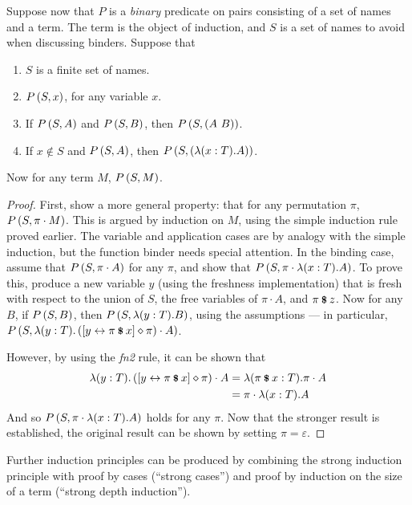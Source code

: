 \begin{lemma}
\label{lemma:strong-induction}
Suppose now that \(P\) is a \emph{binary} predicate on pairs consisting of a set of names and a term.
The term is the object of induction, and \(S\) is a set of names to avoid when discussing binders.
Suppose that
\begin{enumerate}
\item
\(S\) is a finite set of names.
\item
\(P\left(S, x\right)\), for any variable \(x\).
\item
If \(P\left(S, A\right)\) and \(P\left(S, B\right)\), then \(P\left(S, \left(A\ B\right)\right)\).
\item
If \(x \notin S\) and \(P\left(S, A\right)\), then \(P\left(S, \left(\lambda (x:T). A\right)\right)\).
\end{enumerate}
Now for any term \(M\), \(P\left(S, M\right)\).
\end{lemma}
\begin{proof}
First, show a more general property: that for any permutation \(\pi\), \(P\left(S, \pi \cdot M\right)\).
This is argued by induction on \(M\), using the simple induction rule proved earlier.
The variable and application cases are by analogy with the simple induction, but the function binder needs special attention.
In the binding case, assume that \(P\left(S, \pi \cdot A\right)\) for any \(\pi\), and show that \(P\left(S, \pi \cdot \lambda (x:T).A\right)\).
To prove this, produce a new variable \(y\) (using the freshness implementation) that is fresh with respect to the union of \(S\), the free variables of \(\pi \cdot A\), and \(\pi \mathbin{\textrm{\footnotesize{\textbf{\$}}}} z\).
Now for any \(B\), if \(P\left(S, B\right)\), then \(P\left(S, \lambda (y:T).B\right)\), using the assumptions --- in particular, \(P\left(S, \lambda (y:T). \left([y \leftrightarrow \pi \mathbin{\textrm{\footnotesize{\textbf{\$}}}} x] \diamond \pi\right) \cdot A\right)\).

However, by using the \emph{fn2} rule, it can be shown that
\begin{align*}
\lambda (y:T). \left([y \leftrightarrow \pi \mathbin{\textrm{\footnotesize{\textbf{\$}}}} x] \diamond \pi\right) \cdot A
&= \lambda (\pi \mathbin{\textrm{\footnotesize{\textbf{\$}}}} x:T). \pi \cdot A\\
&= \pi \cdot \lambda (x:T). A
\end{align*}
And so \(P\left(S, \pi \cdot \lambda (x:T).A\right)\) holds for any \(\pi\).
Now that the stronger result is established, the original result can be shown by setting \(\pi = \varepsilon\).
\end{proof}

Further induction principles can be produced by combining the strong induction principle with proof by cases (``strong cases'') and proof by induction on the size of a term (``strong depth induction'').

